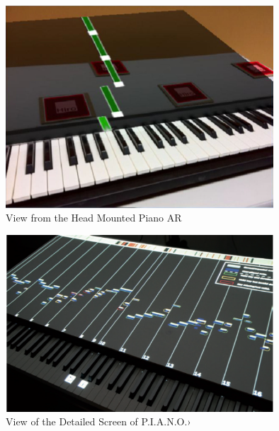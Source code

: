 \documentclass[manuscript,screen]{acmart}
\begin{document}
\begin{figure}
    \centering
    \includegraphics[width=10cm]{figures/headmountedview.png}
    \caption{View from the Head Mounted Piano AR  }
    \label{fig:View from the HeadMounted}
\end{figure}

\begin{figure}
    \centering
    \includegraphics[width=10cm]{figures/piano}
    \caption{View of the Detailed Screen of P.I.A.N.O.› }
    \label{fig:View from the HeadMounted}
\end{figure}











\end{document}
